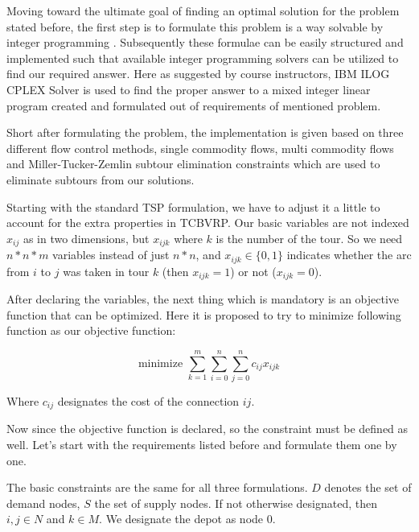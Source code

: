 Moving toward the ultimate goal of finding an optimal solution for the problem
stated before, the first step is to formulate this problem is a way solvable by
integer programming \cite{garfinkel1972integer}. Subsequently these formulae can be easily structured
and implemented such that available integer programming solvers can be utilized to
find our required answer. Here as suggested by course instructors, IBM ILOG
CPLEX Solver \cite{cplex2009v12}
is used to find the proper answer to a mixed integer linear program created and
formulated out of requirements of mentioned problem.

Short after formulating the problem, the implementation is given based on three
different flow control methods, single commodity flows, multi commodity flows
and Miller-Tucker-Zemlin subtour elimination constraints which are used to
eliminate subtours from our solutions.

Starting with the standard TSP \cite{miller1960integer} formulation, we have to adjust it a
little to account for the extra properties in TCBVRP. Our basic variables are not
indexed $x_{ij}$ as in two dimensions, but $x_{ijk}$ where $k$ is the number
of the tour. So we need $n*n*m$ variables instead of just $n*n$, and $x_{ijk} \in \{0,1\}$
indicates whether the arc from $i$ to $j$ was taken in tour $k$ (then $x_{ijk} = 1$) or
not ($x_{ijk} = 0$).

After declaring the variables, the next thing which is mandatory is an objective function 
that can be optimized. Here it is proposed to try to minimize following function as our
objective function:

\begin{equation}
\mbox{minimize }\sum_{k = 1}^{m} \sum_{i = 0}^{n} \sum_{j = 0}^{n} c_{ij} x_{ijk}
\end{equation}

Where $c_{ij}$ designates the cost of the connection $ij$.

Now since the objective function is declared, so the constraint must be defined
as well. Let's start with the requirements listed before and formulate them one
by one.

The basic constraints are the same for all three formulations. $D$ denotes the
set of demand nodes, $S$ the set of supply nodes. If not otherwise designated,
then $i, j \in N$ and $k \in M$. We designate the depot as node $0$.

